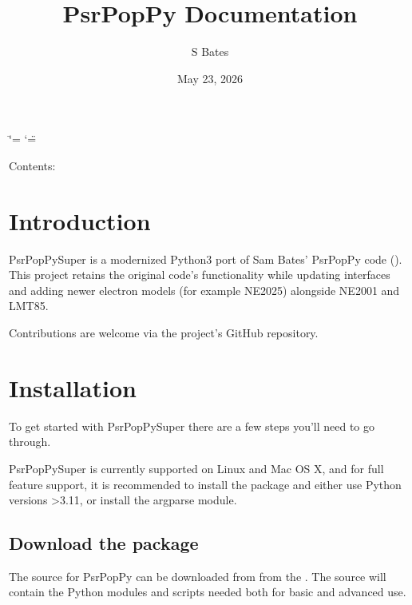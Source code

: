 \documentclass[letterpaper,10pt,english]{sphinxmanual}
\title{PsrPopPy Documentation}
\date{May 23, 2026}
\author{S Bates}
\begin{document}
\ifdefined\shorthandoff
  \ifnum\catcode`\=\string=\active\shorthandoff{=}\fi
  \ifnum\catcode`\"=\active{}\fi
\fi

\pagestyle{empty}
\sphinxmaketitle
\pagestyle{plain}
\sphinxtableofcontents
\pagestyle{normal}
\label{\detokenize{index::doc}}


\sphinxAtStartPar
Contents:

\sphinxstepscope


\chapter{Introduction}
\label{\detokenize{introduction:introduction}}\label{\detokenize{introduction::doc}}
\sphinxAtStartPar
PsrPopPySuper is a modernized Python3 port of Sam Bates’ PsrPopPy code ().
This project retains the original code’s functionality while updating interfaces and adding newer
electron models (for example NE\sphinxhyphen{}2025) alongside NE\sphinxhyphen{}2001 and LMT85.

\sphinxAtStartPar
Contributions are welcome via the project’s GitHub repository.

\sphinxstepscope


\chapter{Installation}
\label{\detokenize{installation:installation}}\label{\detokenize{installation:id1}}\label{\detokenize{installation::doc}}
\sphinxAtStartPar
To get started with PsrPopPySuper there are a few steps you’ll need to
go through.

\sphinxAtStartPar
PsrPopPySuper is currently supported on Linux and Mac OS X, and for
full feature support, it is recommended to install the
 package and either use
Python versions \textgreater{}3.11, or install the argparse module.


\section{Download the package}
\label{\detokenize{installation:download-the-package}}\label{\detokenize{installation:download-package}}
\sphinxAtStartPar
The source for PsrPopPy can be downloaded from 
from the .
The source will contain the Python modules and scripts needed both for
basic and advanced use.
\end{document}
